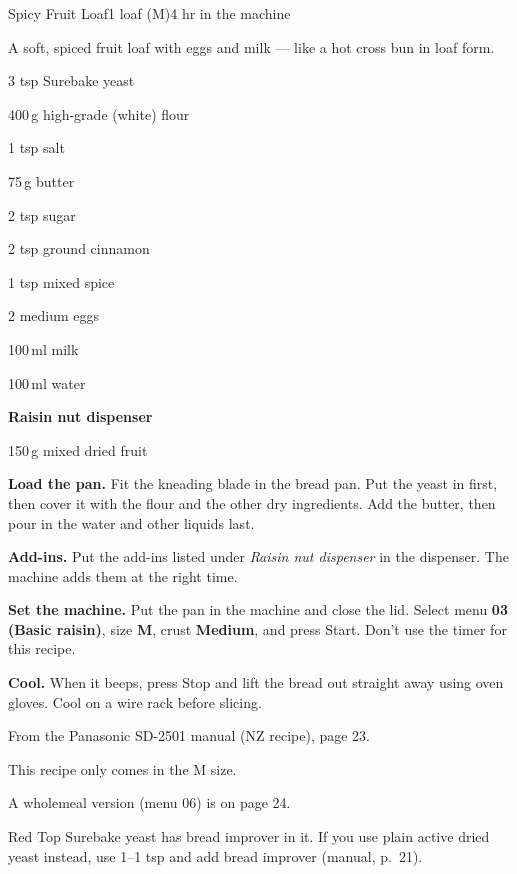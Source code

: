 \begin{recipebox}{Spicy Fruit Loaf}{1 loaf (M)}{4 hr in the machine}

A soft, spiced fruit loaf with eggs and milk --- like a hot cross bun in loaf form.

\begin{ingredients}
  \item 3 tsp Surebake yeast
  \item 400\,g high-grade (white) flour
  \item 1 tsp salt
  \item 75\,g butter
  \item 2 tsp sugar
  \item 2 tsp ground cinnamon
  \item 1 tsp mixed spice
  \item 2 medium eggs
  \item 100\,ml milk
  \item 100\,ml water
  \item[] \textbf{Raisin nut dispenser}
  \item 150\,g mixed dried fruit
\end{ingredients}

\begin{method}
  \item \textbf{Load the pan.} Fit the kneading blade in the bread pan. Put the yeast in first, then cover it with the flour and the other dry ingredients. Add the butter, then pour in the water and other liquids last.
  \item \textbf{Add-ins.} Put the add-ins listed under \emph{Raisin nut dispenser} in the dispenser. The machine adds them at the right time.
  \item \textbf{Set the machine.} Put the pan in the machine and close the lid. Select menu \textbf{03 (Basic raisin)}, size \textbf{M}, crust \textbf{Medium}, and press Start. Don't use the timer for this recipe.
  \item \textbf{Cool.} When it beeps, press Stop and lift the bread out straight away using oven gloves. Cool on a wire rack before slicing.
\end{method}

\begin{notelist}
  \item From the Panasonic SD-2501 manual (NZ recipe), page 23.
  \item This recipe only comes in the M size.
  \item A wholemeal version (menu 06) is on page 24.
  \item Red Top Surebake yeast has bread improver in it. If you use plain active dried yeast instead, use 1--1 tsp and add bread improver (manual, p.~21).
\end{notelist}

\end{recipebox}
